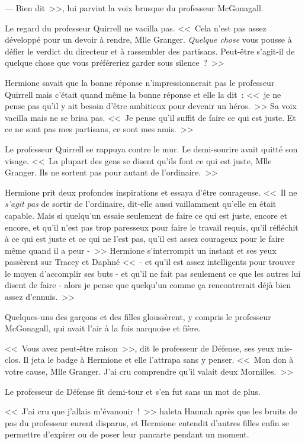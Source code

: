 --- Bien dit~>>, lui parvint la voix brusque du professeur McGonagall.

Le regard du professeur Quirrell ne vacilla pas. <<~Cela n'est pas assez développé pour un devoir à rendre, Mlle Granger. \emph{Quelque chose} vous pousse à défier le verdict du directeur et à rassembler des partisans. Peut-être s'agit-il de quelque chose que vous préféreriez garder sous silence~?~>>

Hermione savait que la bonne réponse n'impressionnerait pas le professeur Quirrell mais c'était quand même la bonne réponse et elle la dit~: <<~je ne pense pas qu'il y ait besoin d'être ambitieux pour devenir un héros.~>> Sa voix vacilla mais ne se brisa pas. <<~Je pense qu'il suffit de faire ce qui est juste. Et ce ne sont pas mes partisans, ce sont mes amis.~>>

Le professeur Quirrell se rappuya contre le mur. Le demi-sourire avait quitté son visage. <<~La plupart des gens se disent qu'ils font ce qui est juste, Mlle Granger. Ils ne sortent pas pour autant de l'ordinaire.~>>

Hermione prit deux profondes inspirations et essaya d'être courageuse. <<~Il ne \emph{s'agit pas} de sortir de l'ordinaire, dit-elle aussi vaillamment qu'elle en était capable. Mais si quelqu'un essaie seulement de faire ce qui est juste, encore et encore, et qu'il n'est pas trop paresseux pour faire le travail requis, qu'il réfléchit à ce qui est juste et ce qui ne l'est pas, qu'il est assez courageux pour le faire même quand il a peur -~>> Hermione s'interrompit un instant et ses yeux passèrent sur Tracey et Daphné <<~- et qu'il est assez intelligents pour trouver le moyen d'accomplir ses buts - et qu'il ne fait pas seulement ce que les autres lui disent de faire - alors je pense que quelqu'un comme ça rencontrerait déjà bien assez d'ennuis.~>>

Quelques-uns des garçons et des filles gloussèrent, y compris le professeur McGonagall, qui avait l'air à la fois narquoise et fière.

<<~Vous avez peut-être raison~>>, dit le professeur de Défense, ses yeux mis-clos. Il jeta le badge à Hermione et elle l'attrapa sans y penser. <<~Mon don à votre cause, Mlle Granger. J'ai cru comprendre qu'il valait deux Mornilles.~>>

Le professeur de Défense fit demi-tour et s'en fut sans un mot de plus.

<<~J'ai cru que j'allais m'évanouir~!~>> haleta Hannah après que les bruits de pas du professeur eurent disparus, et Hermione entendit d'autres filles enfin se permettre d'expirer ou de poser leur pancarte pendant un moment.

